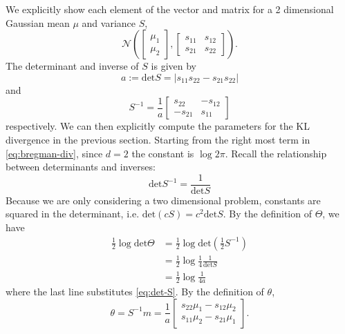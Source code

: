 \documentclass[a4paper]{article}
\newcommand{\normal}{\mathcal{N}}
\newcommand{\vect}[2]{\begin{bmatrix} #1 \\ #2 \end{bmatrix}}
\newcommand{\mat}[4]{\begin{bmatrix} #1 & #2\\ #3& #4 \end{bmatrix}}
\newcommand{\deter}{\mathrm{det}}
\begin{document}
We explicitly show each element of the vector and matrix for a 2 dimensional Gaussian
mean $\mu$ and variance $S$,
\[
  \normal\left( \vect{\mu_1}{\mu_2}, \mat{s_{11}}{s_{12}}{s_{21}}{s_{22}}\right).
\]
The determinant and inverse of $S$ is given by
\begin{equation}
  \label{eq:det-S}
  a := \deter S = |s_{11} s_{22} - s_{21} s_{22}|
\end{equation}
and
\begin{equation}
  \label{eq:inv-S}
  S^{-1} = \frac{1}{a}\mat{s_{22}}{-s_{12}}{-s_{21}}{s_{11}}
\end{equation}
respectively.
We can then explicitly compute the parameters for the KL divergence in the previous section.
Starting from the right most term in \eqref{eq:bregman-div},
since $d=2$ the constant is $\log 2\pi$.
Recall the relationship between determinants and inverses:
\[
  \deter S^{-1} = \frac{1}{\deter S}
\]
Because we are only considering a two dimensional problem, constants are squared in the determinant,
i.e. $\deter(c S) = c^2 \deter S$.
By the definition of $\Theta$, we have
\begin{align*}
  \frac{1}{2} \log \deter \Theta &= \frac{1}{2} \log \deter (\frac{1}{2} S^{-1}) \\
  &= \frac{1}{2} \log \frac{1}{4} \frac{1}{\deter S}\\
  &= \frac{1}{2} \log \frac{1}{4a}
\end{align*}
where the last line substitutes \eqref{eq:det-S}.
By the definition of $\theta$,
\begin{equation}
  \label{eq:theta}
  \theta = S^{-1}m = \frac{1}{a}\vect{s_{22}\mu_1 - s_{12}\mu_2}{s_{11}\mu_2 - s_{21}\mu_1}.
\end{equation}
\end{document}
